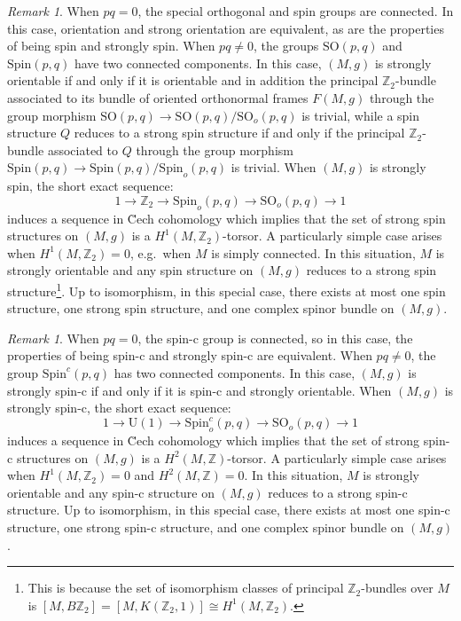 \documentclass[10pt,a4paper,twoside,reqno]{amsart}
\theoremstyle{plain}
\theoremstyle{definition}
\theoremstyle{remark}
\newtheorem{remark}[thm]{Remark}
\def\Z{\mathbb{Z}}
\def\Spin{\mathrm{Spin}}
\def\Spin{\mathrm{Spin}}
\def\SO{\mathrm{SO}}
\def\U{\mathrm{U}}
\begin{document}
\begin{remark}
When $pq=0$, the special orthogonal and spin groups are connected. In this case, orientation and strong orientation are equivalent, as are the properties of being spin and strongly spin. When $pq\neq0$, the groups $\SO(p,q)$ and $\Spin(p,q)$ have two connected components. In this case, $(M,g)$ is strongly orientable if and only if it is orientable and in addition the principal $\Z_2$-bundle associated to its bundle of oriented orthonormal frames $F(M,g)$ through the group morphism $\SO(p,q)\to\SO(p,q)/\SO_o(p,q)$ is trivial, while a spin structure $Q$ reduces to a strong spin structure if and only if the principal $\Z_2$-bundle associated to $Q$ through the group morphism $\Spin(p,q)\to\Spin(p,q)/\Spin_o(p,q)$ is trivial. When $(M,g)$ is strongly spin, the short exact sequence: $$1\to\Z_2\to\Spin_o(p,q)\to\SO_o(p,q)\to1$$ induces a sequence in \u{C}ech cohomology which implies that the set of strong spin structures on $(M,g)$ is a $H^1(M,\Z_2)$-torsor. A particularly simple case arises when $H^1(M,\Z_2)=0$, e.g.\ when $M$ is simply connected. In this situation, $M$ is strongly orientable and any spin structure on $(M,g)$ reduces to a strong spin structure\footnote{This is because the set of isomorphism classes of principal $\Z_2$-bundles over $M$ is $[M,B\Z_2]=[M,K(\Z_2,1)]\cong H^1(M,\Z_2)$.}. Up to isomorphism, in this special case, there exists at most one spin structure, one strong spin structure, and one complex spinor bundle on $(M,g)$.
\end{remark}

\begin{remark}\label{remark:H2(M,Z)-torsor}
When $pq=0$, the spin-c group is connected, so in this case, the properties of being spin-c and strongly spin-c are equivalent. When $pq\neq0$, the group $\Spin^c(p,q)$ has two connected components. In this case, $(M,g)$ is strongly spin-c if and only if it is spin-c and strongly orientable. When $(M,g)$ is strongly spin-c, the short exact sequence: $$1\to\U(1)\to\Spin^c_o(p,q)\to\SO_o(p,q)\to1$$ induces a sequence in \u{C}ech cohomology which implies that the set of strong spin-c structures on $(M,g)$ is a $H^2(M,\Z)$-torsor. A particularly simple case arises when $H^1(M,\Z_2)=0$ and $H^2(M,\Z)=0$. In this situation, $M$ is strongly orientable and any spin-c structure on $(M,g)$ reduces to a strong spin-c structure. Up to isomorphism, in this special case, there exists at most one spin-c structure, one strong spin-c structure, and one complex spinor bundle on $(M,g)$.
\end{remark}
\end{document}
